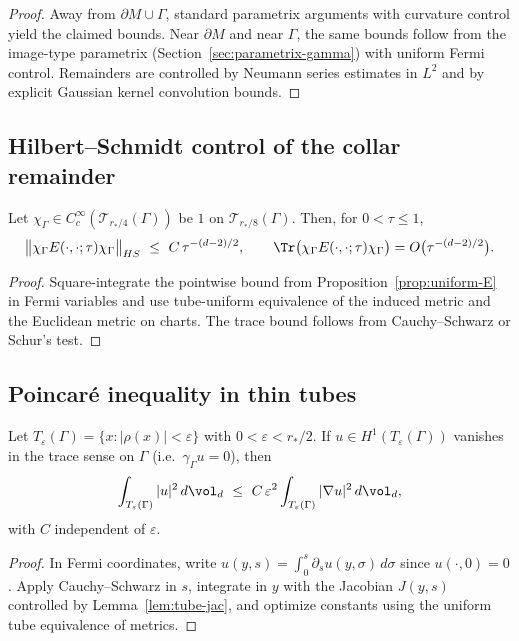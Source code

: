 \begin{proof}[Proof]
Away from $\partial M\cup\Gamma$, standard parametrix arguments with curvature control yield the claimed bounds. 
Near $\partial M$ and near $\Gamma$, the same bounds follow from the image-type parametrix (Section~\ref{sec:parametrix-gamma}) with uniform Fermi control. Remainders are controlled by Neumann series estimates in $L^2$ and by explicit Gaussian kernel convolution bounds.
\end{proof}

\subsection{Hilbert–Schmidt control of the collar remainder}
\begin{corollary}
\label{cor:HS-wall}
Let $\chi_\Gamma\in C_c^\infty(\mathcal T_{r_*/4}(\Gamma))$ be $1$ on $\mathcal T_{r_*/8}(\Gamma)$. Then, for $0<\tau\le1$,
\[
\big\|\chi_\Gamma E(\cdot,\cdot;\tau)\chi_\Gamma\big\|_{HS}
\ \le\ C\,\tau^{-(d-2)/2},\qquad
\Tr\big(\chi_\Gamma E(\cdot,\cdot;\tau)\chi_\Gamma\big)
=O\big(\tau^{-(d-2)/2}\big).
\]
\end{corollary}

\begin{proof}
Square-integrate the pointwise bound from Proposition~\ref{prop:uniform-E} in Fermi variables and use tube-uniform equivalence of the induced metric and the Euclidean metric on charts. The trace bound follows from Cauchy–Schwarz or Schur’s test.
\end{proof}

\subsection{Poincaré inequality in thin tubes}
\begin{lemma}
\label{lem:tube-poincare}
Let $T_\varepsilon(\Gamma)=\{x:|\rho(x)|<\varepsilon\}$ with $0<\varepsilon<r_*/2$. 
If $u\in H^1(T_\varepsilon(\Gamma))$ vanishes in the trace sense on $\Gamma$ (i.e.\ $\gamma_\Gamma u=0$), then
\[
\int_{T_\varepsilon(\Gamma)} |u|^2\,d\vol_d \ \le\ C\,\varepsilon^2\int_{T_\varepsilon(\Gamma)} |\nabla u|^2\,d\vol_d,
\]
with $C$ independent of $\varepsilon$.
\end{lemma}

\begin{proof}
In Fermi coordinates, write $u(y,s)=\int_0^s \partial_s u(y,\sigma)\,d\sigma$ since $u(\cdot,0)=0$. 
Apply Cauchy–Schwarz in $s$, integrate in $y$ with the Jacobian $J(y,s)$ controlled by Lemma~\ref{lem:tube-jac}, and optimize constants using the uniform tube equivalence of metrics.
\end{proof}

